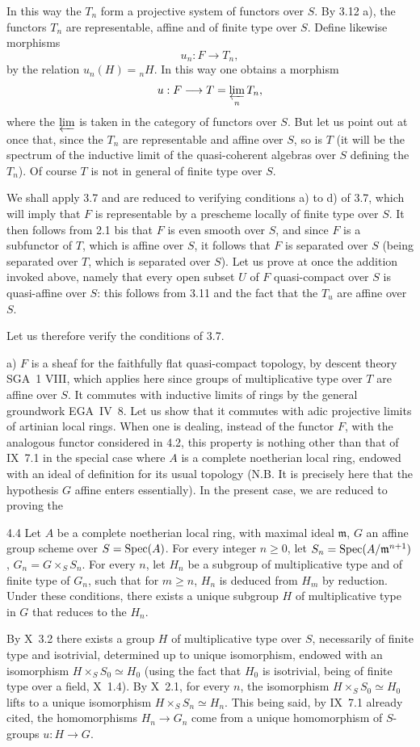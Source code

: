 In this way the $T_n$ form a projective system of functors over $S$. By 3.12 a), the functors $T_n$ are representable, affine and of finite type over $S$. Define likewise morphisms
\[
u_n:F\to T_n,
\]
by the relation $u_n(H)={}_nH$. In this way one obtains a morphism
\[
u:F\to T=\varprojlim_n T_n,
\]
where the $\varprojlim$ is taken in the category of functors over $S$. But let us point out at once that, since the $T_n$ are representable and affine over $S$, so is $T$ (it will be the spectrum of the inductive limit of the quasi-coherent algebras over $S$ defining the $T_n$). Of course $T$ is not in general of finite type over $S$.

We shall apply 3.7 and are reduced to verifying conditions a) to d) of 3.7, which will imply that $F$ is representable by a prescheme locally of finite type over $S$. It then follows from 2.1 bis that $F$ is even smooth over $S$, and since $F$ is a subfunctor of $T$, which is affine over $S$, it follows that $F$ is separated over $S$ (being separated over $T$, which is separated over $S$). Let us prove at once the addition invoked above, namely that every open subset $U$ of $F$ quasi-compact over $S$ is quasi-affine over $S$: this follows from 3.11 and the fact that the $T_u$ are affine over $S$.

Let us therefore verify the conditions of 3.7.

a) $F$ is a sheaf for the faithfully flat quasi-compact topology, by descent theory SGA~1 VIII, which applies here since groups of multiplicative type over $T$ are affine over $S$. It commutes with inductive limits of rings by the general groundwork EGA~IV~8. Let us show that it commutes with adic projective limits of artinian local rings. When one is dealing, instead of the functor $F$, with the analogous functor considered in 4.2, this property is nothing other than that of IX~7.1 in the special case where $A$ is a complete noetherian local ring, endowed with an ideal of definition for its usual topology (N.B. It is precisely here that the hypothesis $G$ affine enters essentially). In the present case, we are reduced to proving the
\begin{lemma}{4.4}\label{XI.4.4}
Let $A$ be a complete noetherian local ring, with maximal ideal $\mathfrak m$, $G$ an affine group scheme over $S=\Spec(A)$. For every integer $n\ge0$, let $S_n=\Spec(A/\mathfrak m^{n+1})$, $G_n=G\times_S S_n$. For every $n$, let $H_n$ be a subgroup of multiplicative type and of finite type of $G_n$, such that for $m\ge n$, $H_n$ is deduced from $H_m$ by reduction. Under these conditions, there exists a unique subgroup $H$ of multiplicative type in $G$ that reduces to the $H_n$.
\end{lemma}
By X~3.2 there exists a group $H$ of multiplicative type over $S$, necessarily of finite type and isotrivial, determined up to unique isomorphism, endowed with an isomorphism $H\times_S S_0\simeq H_0$ (using the fact that $H_0$ is isotrivial, being of finite type over a field, \cf X~1.4). By X~2.1, for every $n$, the isomorphism $H\times_S S_0\simeq H_0$ lifts to a unique isomorphism $H\times_S S_n\simeq H_n$. This being said, by IX~7.1 already cited, the homomorphisms $H_n\to G_n$ come from a unique homomorphism of $S$-groups $u:H\to G$.

